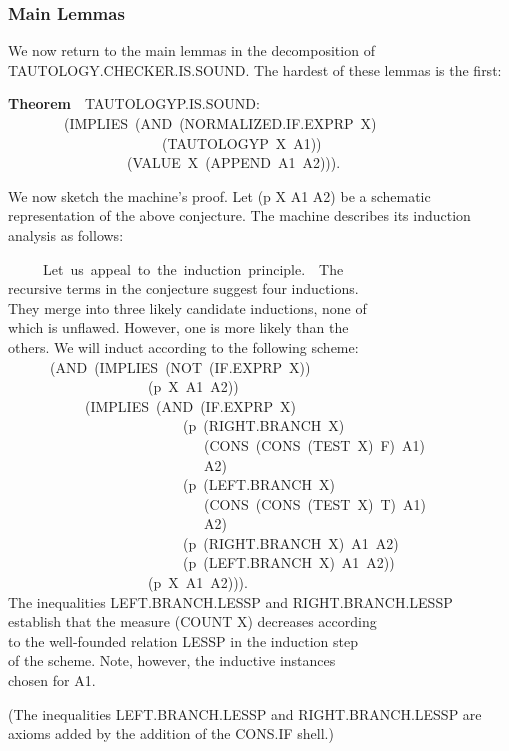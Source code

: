 \documentclass[10pt]{book}
\newenvironment{pubasis}{\begin{flushleft}}{\end{flushleft}}
\newcommand{\axiomordefinition}[1]{\vspace{6pt}\Large\textsf{\textbf{#1}}\normalsize}
\begin{document}
\subsubsection{Main Lemmas}
We now return to the main lemmas in the
decomposition of TAUTOLOGY.CHECKER.IS.SOUND.  The hardest of these lemmas is
the first:
\begin{pubasis}
\axiomordefinition{Theorem}~~TAUTOLOGYP.IS.SOUND:\\
~~~~~~~~(IMPLIES~(AND~(NORMALIZED.IF.EXPRP~X)\\
~~~~~~~~~~~~~~~~~~~~~~(TAUTOLOGYP~X~A1))\\
~~~~~~~~~~~~~~~~~(VALUE~X~(APPEND~A1~A2))).\\
\end{pubasis}
We now sketch the machine's proof.  Let (p X A1 A2) be a schematic
representation of the above conjecture.  The machine describes
its induction analysis as follows:
\begin{pubasis}
~~~~~Let~us~appeal~to~the~induction~principle.~~The\\
recursive terms in the conjecture suggest four inductions.\\
They merge into three likely candidate inductions, none of\\
which is unflawed.  However, one is more likely than the\\
others.  We will induct according to the following scheme:\\
~~~~~~(AND~(IMPLIES~(NOT~(IF.EXPRP~X))\\
~~~~~~~~~~~~~~~~~~~~(p~X~A1~A2))\\
~~~~~~~~~~~(IMPLIES~(AND~(IF.EXPRP~X)\\
~~~~~~~~~~~~~~~~~~~~~~~~~(p~(RIGHT.BRANCH~X)\\
~~~~~~~~~~~~~~~~~~~~~~~~~~~~(CONS~(CONS~(TEST~X)~F)~A1)\\
~~~~~~~~~~~~~~~~~~~~~~~~~~~~A2)\\
~~~~~~~~~~~~~~~~~~~~~~~~~(p~(LEFT.BRANCH~X)\\
~~~~~~~~~~~~~~~~~~~~~~~~~~~~(CONS~(CONS~(TEST~X)~T)~A1)\\
~~~~~~~~~~~~~~~~~~~~~~~~~~~~A2)\\
~~~~~~~~~~~~~~~~~~~~~~~~~(p~(RIGHT.BRANCH~X)~A1~A2)\\
~~~~~~~~~~~~~~~~~~~~~~~~~(p~(LEFT.BRANCH~X)~A1~A2))\\
~~~~~~~~~~~~~~~~~~~~(p~X~A1~A2))).\\
The inequalities LEFT.BRANCH.LESSP and RIGHT.BRANCH.LESSP\\
establish that the measure (COUNT X) decreases according\\
to the well-founded relation LESSP in the induction step\\
of the scheme.  Note, however, the inductive instances\\
chosen for A1.\\
\end{pubasis}
(The inequalities LEFT.BRANCH.LESSP and RIGHT.BRANCH.LESSP
are axioms added by the addition of the CONS.IF shell.)
\end{document}
